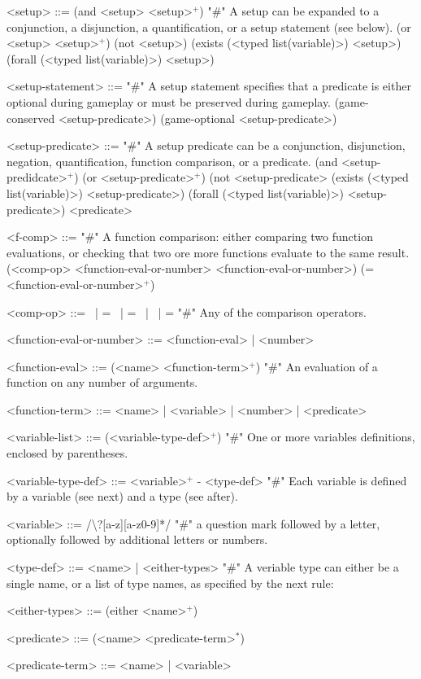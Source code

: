 \documentclass{article}
\begin{document}
\begin{grammar}
<setup> ::= (and <setup> <setup>$^+$) "#" A setup can be expanded to a conjunction, a disjunction, a quantification, or a setup statement (see below).
    \alt (or <setup> <setup>$^+$) 
    \alt (not <setup>)
    \alt (exists (<typed list(variable)>) <setup>)
    \alt (forall (<typed list(variable)>) <setup>) 

<setup-statement> ::= "#" A setup statement specifies that a predicate is either optional during gameplay or must be preserved during gameplay.
    \alt (game-conserved <setup-predicate>) 
    \alt (game-optional <setup-predicate>)

<setup-predicate> ::= "#" A setup predicate can be a conjunction, disjunction, negation, quantification, function comparison, or a predicate.
    \alt (and <setup-predidcate>$^+$) 
    \alt (or <setup-predicate>$^+$) 
    \alt (not <setup-predicate> 
    \alt (exists (<typed list(variable)>) <setup-predicate>) 
    \alt (forall (<typed list(variable)>) <setup-predicate>) 
    \alt <predicate>


<f-comp> ::= "#" A function comparison: either comparing two function evaluations, or checking that two ore more functions evaluate to the same result.
    \alt (<comp-op> <function-eval-or-number> <function-eval-or-number>) 
    \alt (= <function-eval-or-number>$^+$)
    
<comp-op> ::=  \textlangle \ | \textlangle = \ | = \ | \textrangle \ | \textrangle = "#" Any of the comparison operators.

<function-eval-or-number> ::= <function-eval> | <number> 

<function-eval> ::= (<name> <function-term>$^+$) "#" An evaluation of a function on any number of arguments.

<function-term> ::= <name> | <variable> | <number> | <predicate>

<variable-list> ::= (<variable-type-def>$^+$) "#" One or more variables definitions, enclosed by parentheses.

<variable-type-def> ::= <variable>$^+$ - <type-def> "#" Each variable is defined by a variable (see next) and a type (see after).

<variable> ::= /\textbackslash?[a-z][a-z0-9]*/  "#" a question mark followed by a letter, optionally followed by additional letters or numbers.

<type-def> ::= <name> | <either-types> "#" A veriable type can either be a single name, or a list of type names, as specified by the next rule:

<either-types> ::= (either <name>$^+$)

<predicate> ::= (<name> <predicate-term>$^*$)

<predicate-term> ::= <name> | <variable>


\end{grammar}
\end{document}
